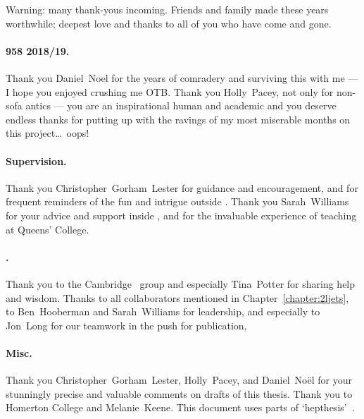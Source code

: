\begin{acknowledgements}
Warning: many thank-yous incoming.
Friends and family made these years worthwhile;
deepest love and thanks to all of you who have come and gone.

\paragraph{958 2018/19.}
Thank you Daniel~Noel for the years of comradery and surviving this with me
--- I hope you enjoyed crushing me OTB.
Thank you Holly~Pacey, not only for non-sofa antics
--- you are an inspirational human and academic and you deserve endless thanks
for putting up with the ravings of my most miserable months on this
project\ldots\ oops!

\paragraph{Supervision.}
Thank you Christopher~Gorham~Lester for guidance and encouragement,
and for frequent reminders of the fun and intrigue outside \atlas.
Thank you Sarah~Williams for your advice and support inside \atlas, and
for the invaluable experience of teaching at Queens' College.

\paragraph{\atlas.}
Thank you to the Cambridge \atlas\ group and especially Tina~Potter for
sharing help and wisdom.
Thanks to all collaborators mentioned in Chapter~\ref{chapter:2ljets},
to Ben~Hooberman and Sarah~Williams for leadership, and especially to
Jon~Long for our teamwork in the push for publication,

\paragraph{Misc.}
Thank you Christopher~Gorham~Lester, Holly~Pacey, and Daniel~No\"el for your
stunningly precise and valuable comments on drafts of this thesis.
Thank you to Homerton College and Melanie~Keene.
This document uses parts of `hepthesis'~\cite{hepthesis}.
\end{acknowledgements}


